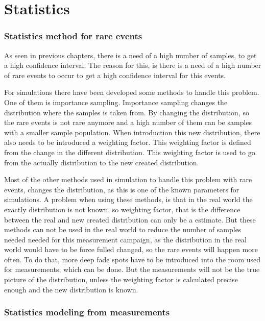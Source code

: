 \chapter{Statistics}

\subsection{Statistics method for rare events}
As seen in previous chapters, there is a need of a high number of samples, to get a high confidence interval. The reason for this, is there is a need of a high number of rare events to occur to get a high confidence interval for this events. 

For simulations there have been developed some methods to handle this problem. One of them is importance sampling. Importance sampling changes the distribution where the samples is taken from. By changing the distribution, so the rare events is not rare anymore and a high number of them can be samples with a smaller sample population. When introduction this new distribution, there also needs to be introduced a weighting factor. This weighting factor is defined from the change in the different distribution. This weighting factor is used to go from the actually distribution to the new created distribution.

Most of the other methods used in simulation to handle this problem with rare events, changes the distribution, as this is one of the known parameters for simulations. A problem when using these methods, is that in the real world the exactly distribution is not known, so weighting factor, that is the difference between the real and new created distribution can only be a estimate. But these methods can not be used in the real world to reduce the number of samples needed needed for this measurement campaign, as the distribution in the real world would have to be force fulled changed, so the rare events will happen more often. To do that, more deep fade spots have to be introduced into the room used for measurements, which can be done. But the measurements will not be the true picture of the distribution, unless the weighting factor is calculated precise enough and the new distribution is known.




\subsection{Statistics modeling from measurements}
